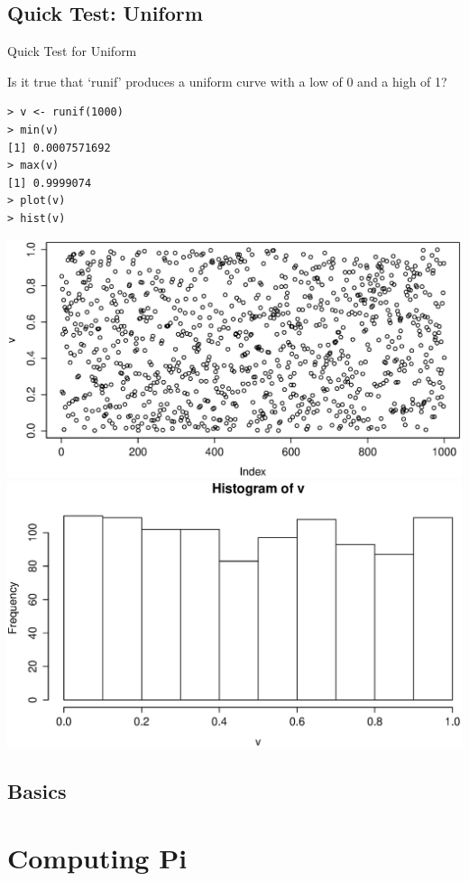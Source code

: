 \documentclass{beamer}
\begin{document}
\subsection{Quick Test: Uniform}
\begin{frame}[fragile]{Quick Test for Uniform}

Is it true that `runif' produces a uniform curve with a low of 0 and a high of 1?

\begin{verbatim}
> v <- runif(1000)
> min(v)
[1] 0.0007571692
> max(v)
[1] 0.9999074
> plot(v)
> hist(v)
\end{verbatim}

\includegraphics[scale=0.2]{uniform_plot.eps}
\includegraphics[scale=0.2]{uniform_hist.eps}

\end{frame}

\subsection{Basics}

\section{Computing Pi}
\end{document}
